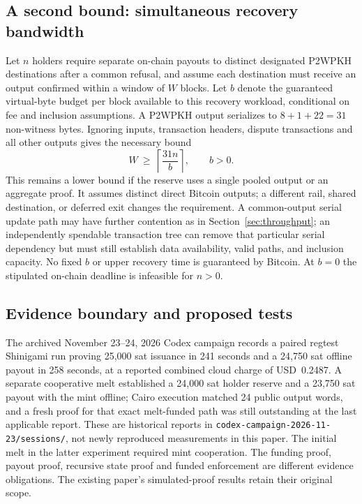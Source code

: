 \subsection{A second bound: simultaneous recovery bandwidth}

Let $n$ holders require separate on-chain payouts to distinct designated P2WPKH destinations after a common refusal, and assume each destination must receive an output confirmed within a window of $W$ blocks. Let $b$ denote the guaranteed virtual-byte budget per block available to this recovery workload, conditional on fee and inclusion assumptions. A P2WPKH output serializes to $8+1+22=31$ non-witness bytes. Ignoring inputs, transaction headers, dispute transactions and all other outputs gives the necessary bound
\begin{equation}
 W\ \geq\ \left\lceil\frac{31n}{b}\right\rceil,\qquad b>0.
\label{eq:cashu-bandwidth}
\end{equation}
This remains a lower bound if the reserve uses a single pooled output or an aggregate proof. It assumes distinct direct Bitcoin outputs; a different rail, shared destination, or deferred exit changes the requirement. A common-output serial update path may have further contention as in Section~\ref{sec:throughput}; an independently spendable transaction tree can remove that particular serial dependency but must still establish data availability, valid paths, and inclusion capacity. No fixed $b$ or upper recovery time is guaranteed by Bitcoin. At $b=0$ the stipulated on-chain deadline is infeasible for $n>0$.

\subsection{Evidence boundary and proposed tests}

The archived November 23--24, 2026 Codex campaign records a paired regtest Shinigami run proving 25,000 sat issuance in 241 seconds and a 24,750 sat offline payout in 258 seconds, at a reported combined cloud charge of USD~0.2487. A separate cooperative melt established a 24,000 sat holder reserve and a 23,750 sat payout with the mint offline; Cairo execution matched 24 public output words, and a fresh proof for that exact melt-funded path was still outstanding at the last applicable report. These are historical reports in \texttt{codex-campaign-2026-11-23/sessions/}, not newly reproduced measurements in this paper. The initial melt in the latter experiment required mint cooperation. The funding proof, payout proof, recursive state proof and funded enforcement are different evidence obligations. The existing paper's simulated-proof results retain their original scope.


